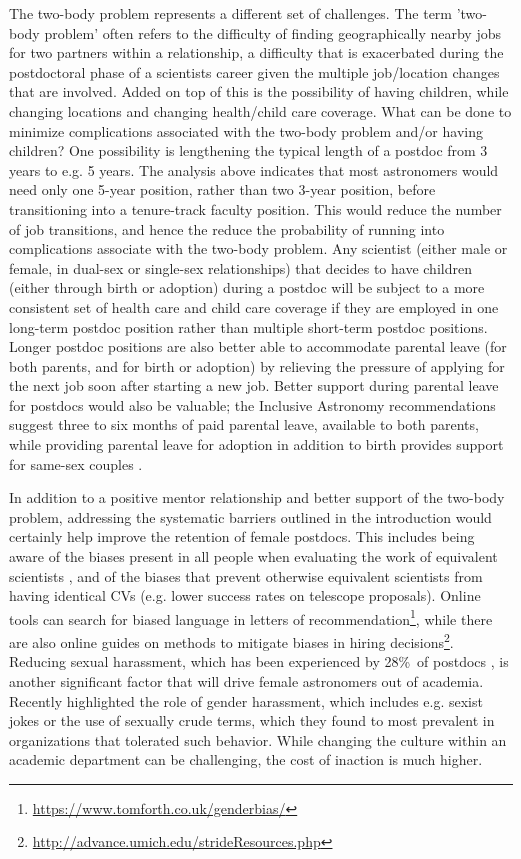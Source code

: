 \documentclass[modern]{aastex62}
\begin{document}
The two-body problem represents a different set of challenges. The term 'two-body problem' often refers to the difficulty of finding geographically nearby jobs for two partners within a relationship, a difficulty that is exacerbated during the postdoctoral phase of a scientists career given the multiple job/location changes that are involved. Added on top of this is the possibility of having children, while changing locations and changing health/child care coverage. What can be done to minimize complications associated with the two-body problem and/or having children? One possibility is lengthening the typical length of a postdoc from 3 years to e.g. 5 years. The analysis above indicates that most astronomers would need only one 5-year position, rather than two 3-year position, before transitioning into a tenure-track faculty position. This would reduce the number of job transitions, and hence the reduce the probability of running into complications associate with the two-body problem. Any scientist (either male or female, in dual-sex or single-sex relationships) that decides to have children (either through birth or adoption) during a postdoc will be subject to a more consistent set of health care and child care coverage if they are employed in one long-term postdoc position rather than multiple short-term postdoc positions. Longer postdoc positions are also better able to accommodate parental leave (for both parents, and for birth or adoption) by relieving the pressure of applying for the next job soon after starting a new job. Better support during parental leave for postdocs would also be valuable; the Inclusive Astronomy recommendations suggest three to six months of paid parental leave, available to both parents, while providing parental leave for adoption in addition to birth provides support for same-sex couples \citep{ath16}.

In addition to a positive mentor relationship and better support of the two-body problem, addressing the systematic barriers outlined in the introduction would certainly help improve the retention of female postdocs. This includes being aware of the biases present in all people when evaluating the work of equivalent scientists \citep{ste99,mos12,riv17}, and of the biases that prevent otherwise equivalent scientists from having identical CVs (e.g. lower success rates on telescope proposals). Online tools can search for biased language in letters of recommendation\footnote{\url{https://www.tomforth.co.uk/genderbias/}}, while there are also online guides on methods to mitigate biases in hiring decisions\footnote{\url{http://advance.umich.edu/strideResources.php}}. Reducing sexual harassment, which has been experienced by 28\%\ of postdocs \citep{sle17}, is another significant factor that will drive female astronomers out of academia. Recently \citet{nat18} highlighted the role of gender harassment, which includes e.g. sexist jokes or the use of sexually crude terms, which they found to most prevalent in organizations that tolerated such behavior. While changing the culture within an academic department can be challenging, the cost of inaction is much higher. 
\end{document}
